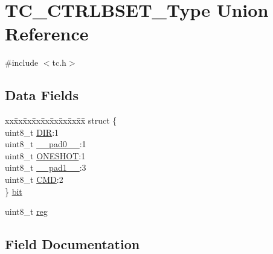 \hypertarget{union_t_c___c_t_r_l_b_s_e_t___type}{}\section{T\+C\+\_\+\+C\+T\+R\+L\+B\+S\+E\+T\+\_\+\+Type Union Reference}
\label{union_t_c___c_t_r_l_b_s_e_t___type}


{\ttfamily \#include $<$tc.\+h$>$}

\subsection*{Data Fields}
\begin{DoxyCompactItemize}
\item 
\begin{tabbing}
xx\=xx\=xx\=xx\=xx\=xx\=xx\=xx\=xx\=\kill
struct \{\\
\>uint8\_t \mbox{\hyperlink{union_t_c___c_t_r_l_b_s_e_t___type_a58808c7e66b07b82b662e956b63f7e70}{DIR}}:1\\
\>uint8\_t \mbox{\hyperlink{union_t_c___c_t_r_l_b_s_e_t___type_a8b4eebe79ded0459acec2f4950102ba3}{\_\_pad0\_\_}}:1\\
\>uint8\_t \mbox{\hyperlink{union_t_c___c_t_r_l_b_s_e_t___type_a7b9c94dc8f69244e81941bd1c96ca561}{ONESHOT}}:1\\
\>uint8\_t \mbox{\hyperlink{union_t_c___c_t_r_l_b_s_e_t___type_a77f12d2e278bd5c07712648ac0df5e08}{\_\_pad1\_\_}}:3\\
\>uint8\_t \mbox{\hyperlink{union_t_c___c_t_r_l_b_s_e_t___type_a1c855495e78c2efdf239795ed16d8b3e}{CMD}}:2\\
\} \mbox{\hyperlink{union_t_c___c_t_r_l_b_s_e_t___type_a23efea800220b2b6bfccfd79ca9b69e2}{bit}}\\

\end{tabbing}\item 
uint8\+\_\+t \mbox{\hyperlink{union_t_c___c_t_r_l_b_s_e_t___type_a9428adc9af4653a2050e2536b55dec8d}{reg}}
\end{DoxyCompactItemize}


\subsection{Field Documentation}
\mbox{\label{union_t_c___c_t_r_l_b_s_e_t___type_a8b4eebe79ded0459acec2f4950102ba3}} 

